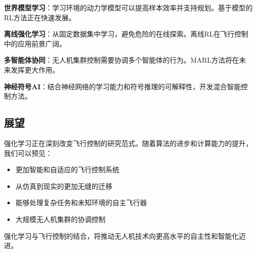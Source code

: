 \documentclass[12pt,a4paper]{ctexart}
\begin{document}
\textbf{世界模型学习}：学习环境的动力学模型可以提高样本效率并支持规划。基于模型的RL方法正在快速发展。

\textbf{离线强化学习}：从固定数据集中学习，避免危险的在线探索。离线RL在飞行控制中的应用前景广阔。

\textbf{多智能体协同}：无人机集群控制需要协调多个智能体的行为。MARL方法将在未来发挥更大作用。

\textbf{神经符号AI}：结合神经网络的学习能力和符号推理的可解释性，开发混合智能控制方法。

\subsection{展望}

强化学习正在深刻改变飞行控制的研究范式。随着算法的进步和计算能力的提升，我们可以预见：

\begin{itemize}
    \item 更加智能和自适应的飞行控制系统
    \item 从仿真到现实的更加无缝的迁移
    \item 能够处理复杂任务和未知环境的自主飞行器
    \item 大规模无人机集群的协调控制
\end{itemize}

强化学习与飞行控制的结合，将推动无人机技术向更高水平的自主性和智能化迈进。
\end{document}

